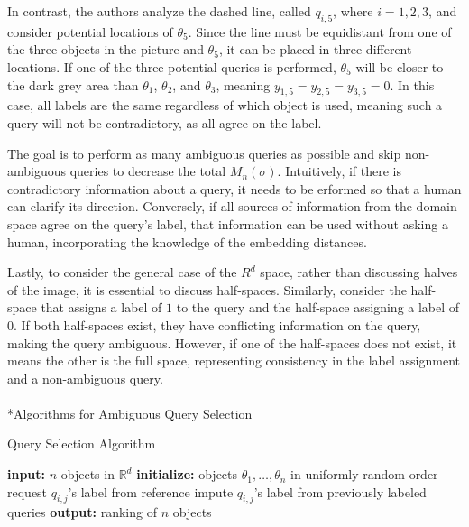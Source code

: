 \documentclass[
  letterpaper,
  numbers=noenddot,
  DIV=11]{scrreprt}
\makeatletter
\let\oldparagraph\paragraph
\renewcommand{\paragraph}{
    \@ifstar
      \xxxParagraphStar
      \xxxParagraphNoStar
  }
\newcommand{\xxxParagraphStar}[1]{\oldparagraph*{#1}\mbox{}}
\newcommand{\xxxParagraphNoStar}[1]{\oldparagraph{#1}\mbox{}}
\theoremstyle{definition}
\theoremstyle{plain}
\theoremstyle{plain}
\theoremstyle{remark}
\makeatother
\begin{document}
In contrast, the authors analyze the dashed line, called \(q_{i,5}\),
where \(i={1,2,3}\), and consider potential locations of \(\theta_5\).
Since the line must be equidistant from one of the three objects in the
picture and \(\theta_5\), it can be placed in three different locations.
If one of the three potential queries is performed, \(\theta_5\) will be
closer to the dark grey area than \(\theta_1\), \(\theta_2\), and
\(\theta_3\), meaning \(y_{1,5} = y_{2,5} = y_{3,5} = 0\). In this case,
all labels are the same regardless of which object is used, meaning such
a query will not be contradictory, as all agree on the label.

The goal is to perform as many ambiguous queries as possible and skip
non-ambiguous queries to decrease the total \(M_n(\sigma)\).
Intuitively, if there is contradictory information about a query, it
needs to be erformed so that a human can clarify its direction.
Conversely, if all sources of information from the domain space agree on
the query's label, that information can be used without asking a human,
incorporating the knowledge of the embedding distances.

Lastly, to consider the general case of the \(R^d\) space, rather than
discussing halves of the image, it is essential to discuss half-spaces.
Similarly, consider the half-space that assigns a label of \(1\) to the
query and the half-space assigning a label of \(0\). If both half-spaces
exist, they have conflicting information on the query, making the query
ambiguous. However, if one of the half-spaces does not exist, it means
the other is the full space, representing consistency in the label
assignment and a non-ambiguous query.

\paragraph*{Algorithms for Ambiguous Query
Selection}\label{algorithms-for-ambiguous-query-selection}

\begin{algorithm}[H]
    \caption{Query Selection Algorithm}
    \label{alg-qsa}
\begin{algorithmic}[1]
        \State \textbf{input:} $n$ objects in $\mathbb{R}^d$
        \State \textbf{initialize:} objects $\theta_1, \dots, \theta_n$ in uniformly random order
                    \State request $q_{i,j}$'s label from reference
                \Else
                    \State impute $q_{i,j}$'s label from previously labeled queries
                \EndIf
            \EndFor
        \EndFor
        \State \textbf{output:} ranking of $n$ objects
    \end{algorithmic}
\end{algorithm}
\end{document}
